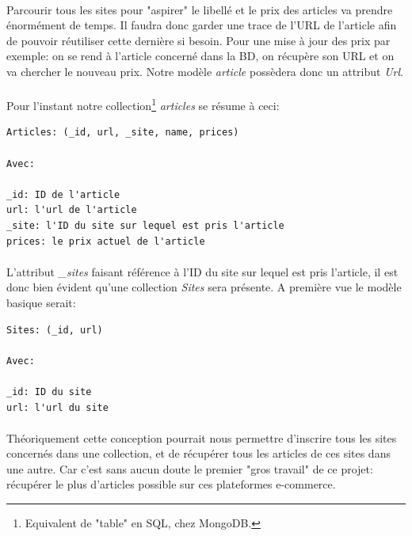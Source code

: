 \documentclass{report}
\begin{document}
\paragraph{}
Parcourir tous les sites pour "aspirer" le libellé et le prix des articles va prendre énormément de temps. Il faudra donc garder une trace de l'URL de l'article afin de pouvoir réutiliser cette dernière si besoin. Pour une mise à jour des prix par exemple: on se rend à l'article concerné dans la BD, on récupère son URL et on va chercher le nouveau prix.
Notre modèle \textit{article} possèdera donc un attribut \textit{Url}.

\newpage
\paragraph{}
Pour l'instant notre collection\footnote{Equivalent de "table" en SQL, chez MongoDB.} \textit{articles} se résume à ceci:


\begin{lstlisting}
Articles: (_id, url, _site, name, prices)

Avec:

_id: ID de l'article
url: l'url de l'article
_site: l'ID du site sur lequel est pris l'article
prices: le prix actuel de l'article
\end{lstlisting}

\paragraph{}
L'attribut \textit{\_sites} faisant référence à l'ID du site sur lequel est pris l'article, il est donc bien évident qu'une collection \textit{Sites} sera présente.
A première vue le modèle basique serait:

\begin{lstlisting}
Sites: (_id, url)

Avec:

_id: ID du site
url: l'url du site
\end{lstlisting}

\paragraph{}
Théoriquement cette conception pourrait nous permettre d'inscrire tous les sites concernés dans une collection, et de récupérer tous les articles de ces sites dans une autre.
Car c'est sans aucun doute le premier "gros travail" de ce projet: récupérer le plus d'articles possible sur ces plateformes e-commerce.
\end{document}
